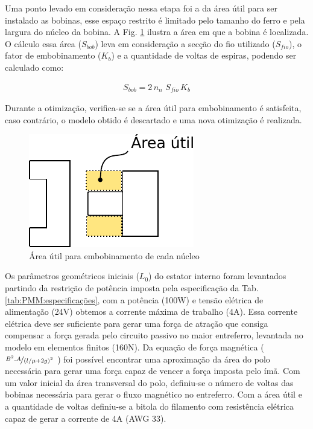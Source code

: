 Uma ponto levado em consideração nessa etapa foi a da área útil para ser instalado as bobinas, esse espaço restrito é limitado pelo tamanho do ferro e pela largura do núcleo da bobina. A Fig. \ref{fig:modelo_ativo_bobina} ilustra a área em que a bobina é localizada. O cálculo essa área ($S_{bob}$) leva em consideração a secção do fio utilizado ($S_{fio}$), o fator de embobinamento ($K_b$) e a quantidade de voltas de espiras, podendo ser calculado como:

\begin{align}
	S_{bob} = 2 \, n_n \, \, S_{fio} \, K_b
\end{align}

Durante a otimização, verifica-se se a área útil para embobinamento é satisfeita, caso contrário, o modelo obtido é descartado e uma nova otimização é realizada.

\begin{figure}[ht!]
\centering
\includegraphics[width=0.7\linewidth]{Figs/modelo_ativo_bobina}
\caption{Área útil para embobinamento de cada núcleo}
\label{fig:modelo_ativo_bobina}
\end{figure}

Os parâmetros geométricos iniciais ($L_0$) do estator interno foram levantados partindo da restrição de potência imposta pela especificação da Tab. \ref{tab:PMM:especificações}, com a potência (100W) e  tensão elétrica de alimentação (24V) obtemos a corrente máxima de trabalho (4A). Essa corrente elétrica deve ser suficiente para gerar uma força de atração que consiga compensar a força gerada pelo circuito passivo no maior entreferro, levantada no modelo em elementos finitos (160N). Da equação de força magnética ($\nicefrac{B^2.A}{(l/\mu +2g)^2}$ ) foi possível encontrar uma aproximação da área do polo necessária para gerar uma força capaz de vencer a força imposta pelo ímã. Com um valor inicial da área transversal do polo, definiu-se o número de voltas das bobinas necessária para gerar o fluxo magnético no entreferro. Com a área útil e a quantidade de voltas definiu-se a bitola do filamento com resistência elétrica capaz de gerar a corrente de 4A (AWG 33).

